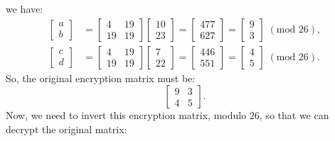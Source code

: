 \documentclass{article}
\begin{document}
we have:
\begin{align*}
    \begin{bmatrix}
        a \\
        b
    \end{bmatrix} &= \begin{bmatrix}
        4 & 19 \\
        19 & 19
    \end{bmatrix} \begin{bmatrix}
        10 \\
        23
    \end{bmatrix} = \begin{bmatrix}
        477 \\
        627
    \end{bmatrix} = \begin{bmatrix}
        9 \\
        3
    \end{bmatrix} \; (\text{mod } 26), \\
    \begin{bmatrix}
        c \\
        d
    \end{bmatrix} &= \begin{bmatrix}
        4 & 19 \\
        19 & 19
    \end{bmatrix} \begin{bmatrix}
        7 \\
        22
    \end{bmatrix} = \begin{bmatrix}
        446 \\
        551
    \end{bmatrix} = \begin{bmatrix}
        4 \\
        5
    \end{bmatrix} \; (\text{mod } 26).
\end{align*}
So, the original encryption matrix must be:
\[
    \begin{bmatrix}
        9 & 3 \\
        4 & 5
    \end{bmatrix}.
\]
Now, we need to invert this encryption matrix, modulo $26$, so that we can decrypt the original matrix:
\end{document}
